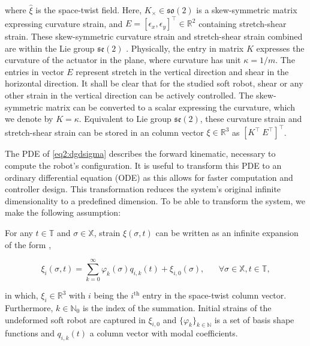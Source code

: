 where $\hat{\xi}$ is the space-twist field. Here, $K_\times \in \mathfrak{so}(2)$ is a skew-symmetric matrix expressing curvature strain, and $E = [\epsilon_x,\epsilon_y]^\top \in \mathbb{R}^2$ containing stretch-shear strain. These skew-symmetric curvature strain and stretch-shear strain combined are within the Lie group $\mathfrak{se}(2)$ \cite{Sola2018}. Physically, the entry in matrix $K$ expresses the curvature of the actuator in the plane, where curvature has unit $\kappa = 1/m$. The entries in vector $E$ represent stretch in the vertical direction and shear in the horizontal direction. It shall be clear that for the studied soft robot, shear or any other strain in the vertical direction can be actively controlled. The skew-symmetric matrix can be converted to a scalar expressing the curvature, which we denote by $K = \kappa$. Equivalent to Lie group $\mathfrak{se}(2)$, these curvature strain and stretch-shear strain can be stored in an column vector $\xi \in \mathbb{R}^3$ as $[K^\top \hspace{3pt} E^\top ]^\top$.

The PDE of \ref{eq2:dgdsigma} describes the forward kinematic, necessary to compute the robot's configuration. It is useful to transform this PDE to an ordinary differential equation (ODE) as this allows for faster computation and controller design. This transformation reduces the system's original infinite dimensionality to a predefined dimension. To be able to transform the system, we make the following assumption: 

\begin{theorem}

For any $t \in \mathbb{T}$ and $\sigma \in \mathbb{X}$, strain $\xi(\sigma,t)$ can be written as an infinite expansion of the form \cite{Caasenbrood2021},

\begin{equation}
\xi_i(\sigma,t) = \sum_{k=0}^\infty \varphi_k(\sigma)q_{i,k}(t) + \xi_{i,0}(\sigma), \hspace{20pt} \forall \sigma \in \mathbb{X}, t \in \mathbb{T},
\label{eq2:strainexact}
\end{equation}

in which, $\xi_{i} \in \mathbb{R}^3 $ with $i$ being the $i^{\text{th}}$ entry in the space-twist column vector. Furthermore, $k \in \mathbb{N}_0$ is the index of the summation. Initial strains of the undeformed soft robot are captured in $\xi_{i,0}$ and $\{\varphi_k\}_{k \in \mathbb{N}}$ is a set of basis shape functions and $q_{i,k}(t)$ a column vector with modal coefficients. 
\end{theorem}


